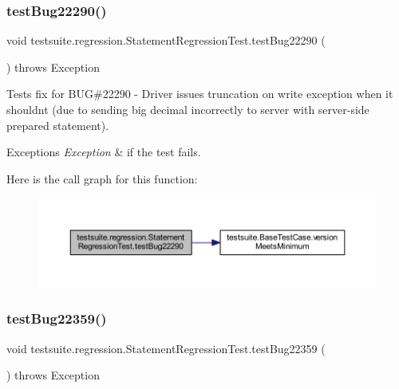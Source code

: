 \subsubsection{\texorpdfstring{test\+Bug22290()}{testBug22290()}}
{\footnotesize\ttfamily void testsuite.\+regression.\+Statement\+Regression\+Test.\+test\+Bug22290 (\begin{DoxyParamCaption}{ }\end{DoxyParamCaption}) throws Exception}

Tests fix for B\+UG\#22290 -\/ Driver issues truncation on write exception when it shouldn\textquotesingle{}t (due to sending big decimal incorrectly to server with server-\/side prepared statement).


\begin{DoxyExceptions}{Exceptions}
{\em Exception} & if the test fails. \\
\hline
\end{DoxyExceptions}
Here is the call graph for this function\+:
\nopagebreak
\begin{figure}[H]
\begin{center}
\leavevmode
\includegraphics[width=350pt]{classtestsuite_1_1regression_1_1_statement_regression_test_ae2acdb736d0a4481a43f894bd9f40499_cgraph}
\end{center}
\end{figure}
\mbox{\label{classtestsuite_1_1regression_1_1_statement_regression_test_a0e9ad9980acf6229f9b41dff9972e1c5}} 
\subsubsection{\texorpdfstring{test\+Bug22359()}{testBug22359()}}
{\footnotesize\ttfamily void testsuite.\+regression.\+Statement\+Regression\+Test.\+test\+Bug22359 (\begin{DoxyParamCaption}{ }\end{DoxyParamCaption}) throws Exception}

